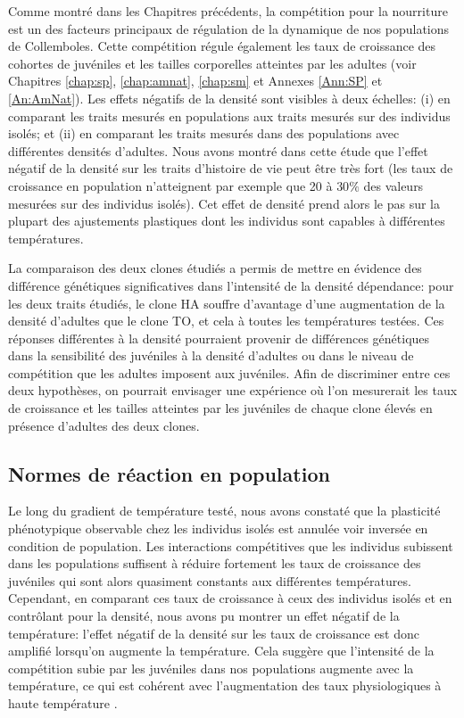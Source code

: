 Comme montré dans les Chapitres précédents, la compétition pour la nourriture
est un des facteurs principaux de régulation de la dynamique de
nos populations de Collemboles. Cette compétition régule également les taux de
croissance des cohortes de juvéniles et les tailles corporelles atteintes par
les adultes (voir Chapitres \ref{chap:sp}, \ref{chap:amnat}, \ref{chap:sm} et
Annexes \ref{Ann:SP} et \ref{An:AmNat}).
Les effets négatifs de la densité sont visibles à deux échelles: (i) en
comparant les traits mesurés en populations aux traits mesurés sur des individus
isolés; et (ii) en comparant les traits mesurés dans des populations avec
différentes densités d'adultes. Nous avons montré dans cette étude que l'effet
négatif de la densité sur les traits d'histoire de vie peut être très fort (les
taux de croissance en population n'atteignent par exemple que 20 à $30\%$ des
valeurs mesurées sur des individus isolés). Cet effet de densité prend alors le
pas sur la plupart des ajustements plastiques dont les individus sont capables à
différentes températures. 

La comparaison des deux clones étudiés a permis de mettre en évidence des
différence génétiques significatives dans l'intensité de la densité dépendance:
pour les deux traits étudiés, le clone HA souffre d'avantage d'une augmentation
de la densité d'adultes que le clone TO, et cela à toutes les températures
testées. Ces réponses différentes à la densité pourraient provenir de
différences génétiques dans la sensibilité des juvéniles à la densité d'adultes
ou dans le niveau de compétition que les adultes imposent aux juvéniles. Afin de
discriminer entre ces deux hypothèses, on pourrait envisager une expérience où
l'on mesurerait les taux de croissance et les tailles atteintes par les juvéniles
de chaque clone élevés en présence d'adultes des deux clones. 

\subsection{Normes de réaction en population}

Le long du gradient de température testé, nous avons constaté que la plasticité
phénotypique observable chez les individus isolés est annulée voir inversée en
condition de population. Les interactions compétitives que les individus
subissent dans les populations suffisent à réduire fortement les taux de
croissance des juvéniles qui sont alors quasiment constants aux différentes
températures. Cependant, en comparant ces taux de croissance à ceux des
individus isolés et en contrôlant pour la densité, nous avons pu montrer un
effet négatif de la température: l'effet négatif de la densité sur les taux de
croissance est donc amplifié lorsqu'on augmente la température. Cela suggère que
l'intensité de la compétition subie par les juvéniles dans nos populations
augmente avec la température, ce qui est cohérent avec l'augmentation des taux
physiologiques à haute température \autocites{gillooly2001a}.

